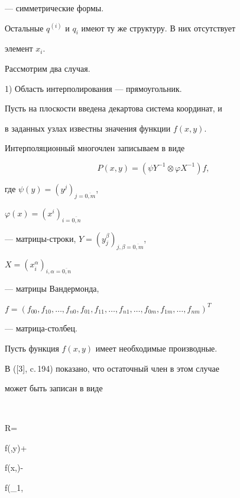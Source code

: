 --- симметрические формы.


Остальные $q^{(i)}$ и $q_{i}$ имеют ту же структуру. В них отсутствует


элемент $x_i$.





Рассмотрим два случая.





1) Область интерполирования --- прямоугольник.


Пусть на плоскости введена декартова система координат, и


в заданных узлах известны значения функции $f(x,y)$.


Интерполяционный многочлен записываем в виде


$$


P(x,y)=(\psi Y^{-1}\otimes\varphi X^{-1})f,


$$


где $\psi(y)=(y^{j})_{j=\overline{0,m}}$,


$\varphi(x)=(x^{i})_{i=\overline{0,n}}$


--- матрицы-строки, $Y=(y_{j}^{\beta})_{j,\beta=\overline{0,m}}$,


$X=(x_{i}^{\alpha})_{i,\alpha=\overline{0,n}}$


--- матрицы Вандермонда,


$f=(f_{00},f_{10},\dotsc,f_{n0},f_{01},f_{11},


\dotsc,f_{n1},\dotsc,f_{0m},f_{1m},\dotsc,f_{nm})^{T}$


--- матрица-столбец.





Пусть функция $f(x,y)$ имеет необходимые производные.


В ([3], c.\,194) показано, что остаточный член в этом случае


может быть записан в виде


$$


R=


f(\xi,y)+




f(x,\eta)-




f(\xi_{1},


